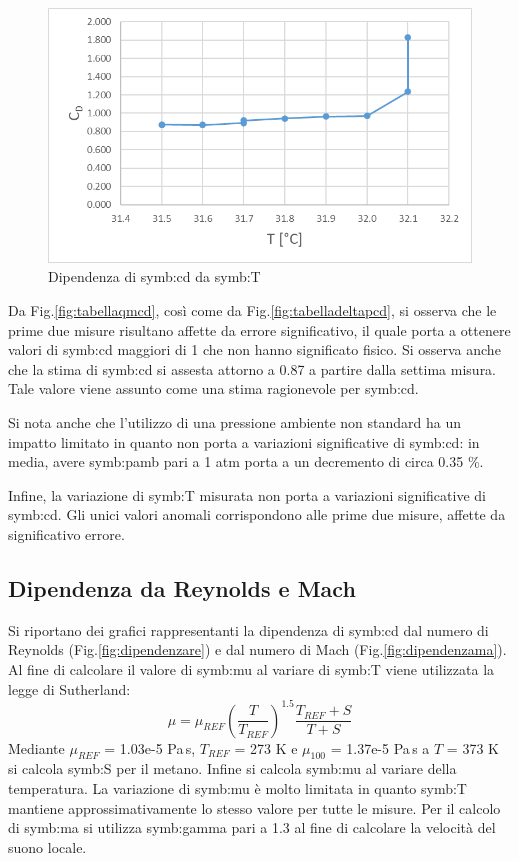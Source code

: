 \begin{figure}
	\centering
	\includegraphics[width=0.5\linewidth]{"chapters/5-laboratorio/tabellaTcd"}
	\caption{Dipendenza di \gls{symb:cd} da \gls{symb:T}}
	\label{fig:tabellatcd}
\end{figure}
Da Fig.\ref{fig:tabellaqmcd}, così come da Fig.\ref{fig:tabelladeltapcd}, si osserva che le prime due misure risultano affette da errore significativo, il quale porta a ottenere valori di \gls{symb:cd} maggiori di 1 che non hanno significato fisico. Si osserva anche che la stima di \gls{symb:cd} si assesta attorno a 0.87 a partire dalla settima misura. Tale valore viene assunto come una stima ragionevole per \gls{symb:cd}.

Si nota anche che l'utilizzo di una pressione ambiente non standard ha un impatto limitato in quanto non porta a variazioni significative di \gls{symb:cd}: in media, avere \gls{symb:pamb} pari a 1 atm porta a un decremento di circa 0.35 \%.

Infine, la variazione di \gls{symb:T} misurata non porta a variazioni significative di \gls{symb:cd}. Gli unici valori anomali corrispondono alle prime due misure, affette da significativo errore. 

\subsection{Dipendenza da Reynolds e Mach}
Si riportano dei grafici rappresentanti la dipendenza di \gls{symb:cd} dal numero di Reynolds (Fig.\ref{fig:dipendenzare}) e dal numero di Mach (Fig.\ref{fig:dipendenzama}). 
Al fine di calcolare il valore di \gls{symb:mu} al variare di \gls{symb:T} viene utilizzata la legge di Sutherland:
\begin{equation}
	\mu = \mu_{\textit{REF}} \left( \frac{T}{T_{\textit{REF}}} \right)^{1.5} \frac{T_{\textit{REF}}+S}{T+S}
\end{equation}
Mediante $\mu_{\textit{REF}}$ = 1.03e-5 Pa\,s, $T_{\textit{REF}}$ = 273 K e $\mu_{\textit{100}}$ = 1.37e-5 Pa\,s a $T$ = 373 K si calcola \gls{symb:S} per il metano.
Infine si calcola \gls{symb:mu} al variare della temperatura. 
La variazione di \gls{symb:mu} è molto limitata in quanto \gls{symb:T} mantiene approssimativamente lo stesso valore per tutte le misure. 
Per il calcolo di \gls{symb:ma} si utilizza \gls{symb:gamma} pari a 1.3 al fine di calcolare la velocità del suono locale. 

